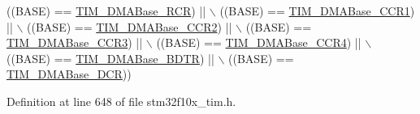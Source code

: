 \begin{DoxyCode}
                               ((BASE) == \hyperlink{group___t_i_m___d_m_a___base__address_ga97f9edceee5c99b32aaa2c6daf849b7d}{TIM\_DMABase\_RCR}) || \(\backslash\)
                               ((BASE) == \hyperlink{group___t_i_m___d_m_a___base__address_ga235a47fa47fd19594a111e6e48c0d5a2}{TIM\_DMABase\_CCR1}) || \(\backslash\)
                               ((BASE) == \hyperlink{group___t_i_m___d_m_a___base__address_ga0e2150dcd3afe31ecb793aa471b3b972}{TIM\_DMABase\_CCR2}) || \(\backslash\)
                               ((BASE) == \hyperlink{group___t_i_m___d_m_a___base__address_ga590c90085bd2b206b941dff2731fed74}{TIM\_DMABase\_CCR3}) || \(\backslash\)
                               ((BASE) == \hyperlink{group___t_i_m___d_m_a___base__address_ga5e84a16e7d8ea369a3a55bb6fe1f2171}{TIM\_DMABase\_CCR4}) || \(\backslash\)
                               ((BASE) == \hyperlink{group___t_i_m___d_m_a___base__address_gaaff22bbf3091c47783c1c68b648c8605}{TIM\_DMABase\_BDTR}) || \(\backslash\)
                               ((BASE) == \hyperlink{group___t_i_m___d_m_a___base__address_ga59e2206e4e03b9d55c9fb5a24e29b01c}{TIM\_DMABase\_DCR}))
\end{DoxyCode}


Definition at line 648 of file stm32f10x\+\_\+tim.\+h.

